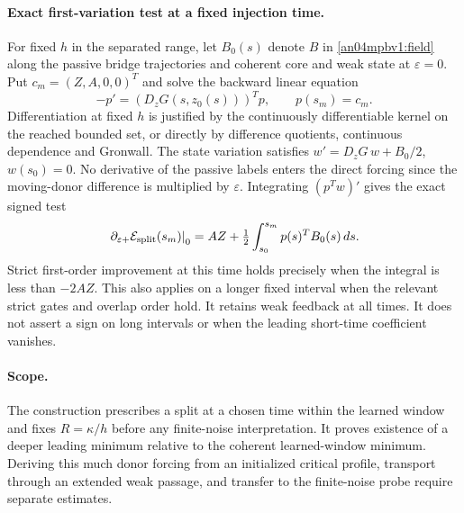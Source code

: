 \documentclass[11pt]{article}
\newcommand{\EE}{\mathcal E}
\newcommand{\dd}{\,d}
\begin{document}
\paragraph{Exact first-variation test at a fixed injection time.}
\label{an04mpbv1:fixed}
For fixed $h$ in the separated range, let $B_0(s)$ denote $B$ in
\eqref{an04mpbv1:field} along the passive bridge trajectories and
coherent core and weak state at $\varepsilon=0$. Put
$c_m=(Z,A,0,0)^T$ and solve the backward linear equation
\[
 -p'=(D_zG(s,z_0(s)))^T p,\qquad p(s_m)=c_m .
\]
Differentiation at fixed $h$ is justified by the continuously
differentiable kernel on the reached bounded set, or directly by
difference quotients, continuous dependence and Gronwall.
The state variation satisfies $w'=D_zG\,w+B_0/2$, $w(s_0)=0$.
No derivative of the passive labels enters the direct forcing since
the moving-donor difference is multiplied by $\varepsilon$.
Integrating $(p^Tw)'$ gives the exact signed test
\[
 \left.\partial_{\varepsilon+}\EE_{\rm split}(s_m)\right|_0
     =AZ+\tfrac12\int_{s_0}^{s_m}p(s)^T B_0(s)\dd s .
\]
Strict first-order improvement at this time holds precisely when
the integral is less than $-2AZ$. This also applies on a longer
fixed interval when the relevant strict gates and overlap order hold.
It retains weak feedback at all times. It does not assert a sign on
long intervals or when the leading short-time coefficient vanishes.

\paragraph{Scope.} The construction prescribes a split at a chosen
time within the learned window and fixes $R=\kappa/h$ before any
finite-noise interpretation. It proves existence of a deeper leading
minimum relative to the coherent learned-window minimum. Deriving
this much donor forcing from an initialized critical profile, transport
through an extended weak passage, and transfer to the finite-noise
probe require separate estimates.
\end{document}
